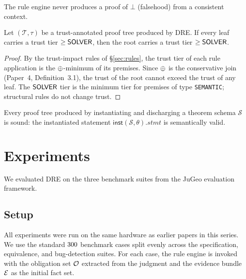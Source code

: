 \documentclass[11pt]{article}
\newcommand{\PTree}{\mathcal{T}}              %
\newcommand{\Schema}{\mathcal{S}}             %
\newcommand{\Inst}{\mathsf{inst}}             %
\begin{document}
\begin{corollary}[Consistency]\label{cor:consistency}
  The rule engine never produces a proof of $\bot$ (falsehood) from a
  consistent context.
\end{corollary}

\begin{corollary}\label{cor:trust}
  Let $(\PTree, \tau)$ be a trust-annotated proof tree produced by
  \textsc{DRE}.  If every leaf carries a trust tier $\geq \mathsf{SOLVER}$,
  then the root carries a trust tier $\geq \mathsf{SOLVER}$.
\end{corollary}

\begin{proof}
  By the trust-impact rules of §\ref{sec:rules}, the trust tier of
  each rule application is the $\oplus$-minimum of its premises.
  Since $\oplus$ is the conservative join (Paper~4, Definition~3.1),
  the trust of the root cannot exceed the trust of any leaf.  The
  $\mathsf{SOLVER}$ tier is the minimum tier for premises of type
  \lstinline|SEMANTIC|; structural rules do not change trust.
\end{proof}

\begin{corollary}\label{cor:schema-sound}
  Every proof tree produced by instantiating and discharging a
  theorem schema $\Schema$ is sound: the instantiated statement
  $\Inst(\Schema, \theta).\mathit{stmt}$ is semantically valid.
\end{corollary}

\section{Experiments}\label{sec:experiments}

We evaluated \textsc{DRE} on the three benchmark suites from the
JuGeo evaluation framework.

\subsection{Setup}

All experiments were run on the same hardware as earlier papers in
this series.  We use the standard $300$ benchmark cases split
evenly across the specification, equivalence, and bug-detection suites.
For each case, the rule engine is invoked with the obligation set
$\mathcal{O}$ extracted from the judgment and the evidence bundle $\mathcal{E}$
as the initial fact set.
\end{document}
